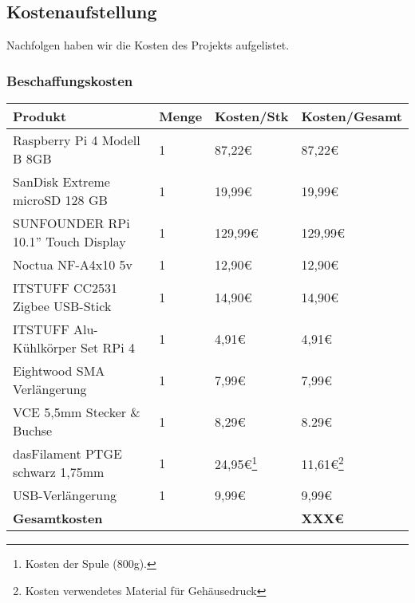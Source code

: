 \subsection{Kostenaufstellung}\label{ku_kosten}
Nachfolgen haben wir die Kosten des Projekts aufgelistet.\par
\subsubsection{Beschaffungskosten}
\begin{center}
\begin{tabularx}{\textwidth}{|p{5.6cm}|p{1.2cm}|p{3.5cm}|p{3.5cm}|}
 	\hline
 	\textbf{Produkt} & \textbf{Menge} & \textbf{Kosten/Stk}  & \textbf{Kosten/Gesamt}\\
	\hline
	Raspberry Pi 4 Modell B 8GB & 1 & 87,22\euro{} & 87,22\euro{} \\
	\hline
	SanDisk Extreme microSD 128 GB & 1 & 19,99\euro{} & 19,99\euro{} \\
	\hline
	SUNFOUNDER RPi 10.1'' Touch Display & 1 & 129,99\euro{} & 129,99\euro{} \\
	\hline
	Noctua NF-A4x10 5v & 1 & 12,90\euro{} & 12,90\euro{} \\
	\hline
	ITSTUFF CC2531 Zigbee USB-Stick & 1 & 14,90\euro{} & 14,90\euro{} \\
	\hline
	ITSTUFF Alu-Kühlkörper Set RPi 4 & 1 & 4,91\euro{} & 4,91\euro{} \\
	\hline
	Eightwood SMA Verlängerung & 1 & 7,99\euro{} & 7,99\euro{} \\ 
	\hline
	VCE 5,5mm Stecker \& Buchse & 1 & 8,29\euro{} & 8.29\euro{} \\
	\hline
	dasFilament PTGE schwarz 1,75mm & 1 & 24,95\euro{}\footnote{Kosten der Spule (800g).} & 11,61\euro{}\footnote{Kosten verwendetes Material für Gehäusedruck} \\
	\hline
	USB-Verlängerung & 1 & 9,99\euro{} & 9,99\euro{}\\
	\hline
	\textbf{Gesamtkosten} &  &  & \textbf{XXX\euro{}} \\ %
	\hline
\end{tabularx}
\end{center}

